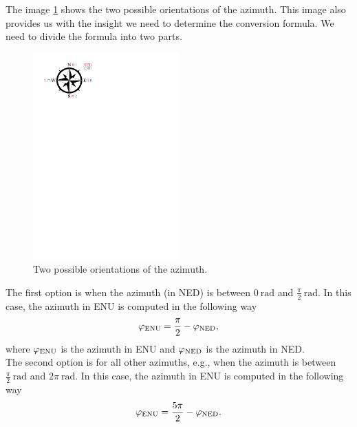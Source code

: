             The image \ref{fig:dir_indi} shows the two possible orientations of the azimuth. This image also provides us with the insight we need to determine the conversion formula. We need to divide the formula into two parts.\\
            \begin{figure}[ht]
                \centering
                \includegraphics[width=0.5\textwidth]{images/direction_indicator.pdf}
                \caption{Two possible orientations of the azimuth.}
                \label{fig:dir_indi}
            \end{figure}
            \noindent The first option is when the azimuth (in NED) is between $0\:\si{\radian}$ and $\frac{\pi}{2}\:\si{\radian}$. In this case, the azimuth in ENU is computed in the following way
            \begin{equation}
                \varphi_{\rm{ENU}} = \frac{\pi}{2} - \varphi_{\rm{NED}},
            \end{equation}
            where $\varphi_{\rm{ENU}}$ is the azimuth in ENU and $\varphi_{\rm{NED}}$ is the azimuth in NED.\\
            The second option is for all other azimuths, e.g., when the azimuth is between $\frac{\pi}{2}\:\si{\radian}$ and $2\pi\:\si{\radian}$. In this case, the azimuth in ENU is computed in the following way
            \begin{equation}
                \varphi_{\rm{ENU}} = \frac{5\pi}{2} - \varphi_{\rm{NED}}.
            \end{equation}\\
        \\
